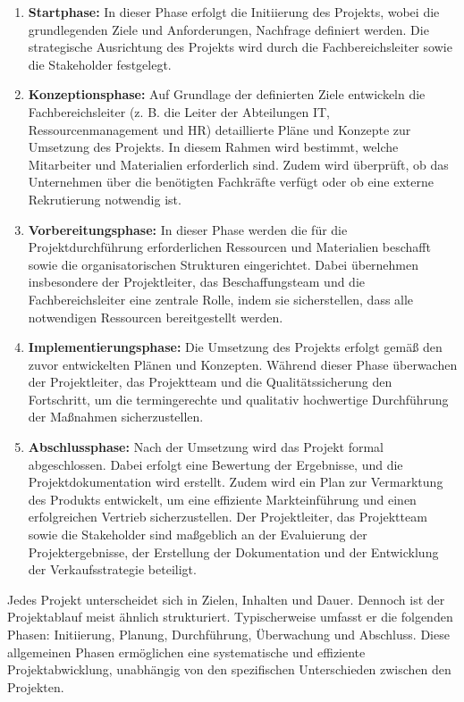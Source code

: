 \documentclass[a4paper, 12pt]{scrartcl}
\begin{document}
	\begin{enumerate}
		\item \textbf{Startphase:} 
In dieser Phase erfolgt die Initiierung des Projekts, wobei die grundlegenden Ziele und Anforderungen, Nachfrage definiert werden. Die strategische Ausrichtung des Projekts wird durch die Fachbereichsleiter sowie die Stakeholder festgelegt.
		\item \textbf{Konzeptionsphase:}
Auf Grundlage der definierten Ziele entwickeln die Fachbereichsleiter (z. B. die Leiter der Abteilungen IT, Ressourcenmanagement und HR) detaillierte Pläne und Konzepte zur Umsetzung des Projekts. In diesem Rahmen wird bestimmt, welche Mitarbeiter und Materialien erforderlich sind. Zudem wird überprüft, ob das Unternehmen über die benötigten Fachkräfte verfügt oder ob eine externe Rekrutierung notwendig ist.
		\item \textbf{Vorbereitungsphase:} 
In dieser Phase werden die für die Projektdurchführung erforderlichen Ressourcen und Materialien beschafft sowie die organisatorischen Strukturen eingerichtet. Dabei übernehmen insbesondere der Projektleiter, das Beschaffungsteam und die Fachbereichsleiter eine zentrale Rolle, indem sie sicherstellen, dass alle notwendigen Ressourcen bereitgestellt werden.
		\item \textbf{Implementierungsphase:}  
Die Umsetzung des Projekts erfolgt gemäß den zuvor entwickelten Plänen und Konzepten. Während dieser Phase überwachen der Projektleiter, das Projektteam und die Qualitätssicherung den Fortschritt, um die termingerechte und qualitativ hochwertige Durchführung der Maßnahmen sicherzustellen.
		\item \textbf{Abschlussphase:} 
Nach der Umsetzung wird das Projekt formal abgeschlossen. Dabei erfolgt eine Bewertung der Ergebnisse, und die Projektdokumentation wird erstellt. Zudem wird ein Plan zur Vermarktung des Produkts entwickelt, um eine effiziente Markteinführung und einen erfolgreichen Vertrieb sicherzustellen. Der Projektleiter, das Projektteam sowie die Stakeholder sind maßgeblich an der Evaluierung der Projektergebnisse, der Erstellung der Dokumentation und der Entwicklung der Verkaufsstrategie beteiligt.
	\end{enumerate}
Jedes Projekt unterscheidet sich in Zielen, Inhalten und Dauer. Dennoch ist der Projektablauf meist ähnlich strukturiert. Typischerweise umfasst er die folgenden Phasen: Initiierung, Planung, Durchführung, Überwachung und Abschluss. Diese allgemeinen Phasen ermöglichen eine systematische und effiziente Projektabwicklung, unabhängig von den spezifischen Unterschieden zwischen den Projekten\cite{wegmann2006projektmanagement}.
\end{document}
